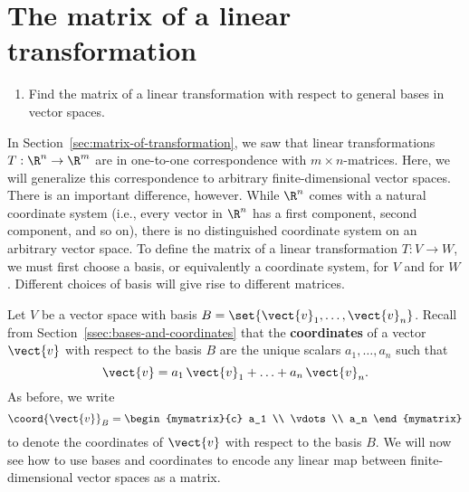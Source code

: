 \section{The matrix of a linear transformation}

\begin{outcome}
  \begin{enumerate}
  \item Find the matrix of a linear transformation with respect to
    general bases in vector spaces.
  \end{enumerate}
\end{outcome}

In Section~\ref{sec:matrix-of-transformation}, we saw that linear
transformations $T:\R^n\to\R^m$ are in one-to-one correspondence with
$m\times n$-matrices. Here, we will generalize this correspondence to
arbitrary finite-dimensional vector spaces. There is an important
difference, however. While $\R^n$ comes with a natural coordinate
system (i.e., every vector in $\R^n$ has a first component, second
component, and so on), there is no distinguished coordinate system on
an arbitrary vector space. To define the matrix of a linear
transformation $T:V\to W$, we must first choose a basis, or
equivalently a coordinate system, for $V$ and for $W$. Different
choices of basis will give rise to different matrices.

Let $V$ be a vector space with basis
$B=\set{\vect{v}_1,\ldots,\vect{v}_n}$. Recall from
Section~\ref{ssec:bases-and-coordinates} that the \textbf{coordinates}
of a vector $\vect{v}$ with respect to the basis $B$%
%
 are the unique scalars
$a_1,\ldots,a_n$ such that
\begin{equation*}
  \vect{v} = a_1\,\vect{v}_1 + \ldots + a_n\,\vect{v}_n.
\end{equation*}
As before, we write
\begin{equation*}
  \coord{\vect{v}}_B = \begin{mymatrix}{c} a_1 \\ \vdots \\ a_n \end{mymatrix}
\end{equation*}
to denote the coordinates of $\vect{v}$ with respect to the basis $B$.
We will now see how to use bases and coordinates to encode any linear
map between finite-dimensional vector spaces as a matrix.

